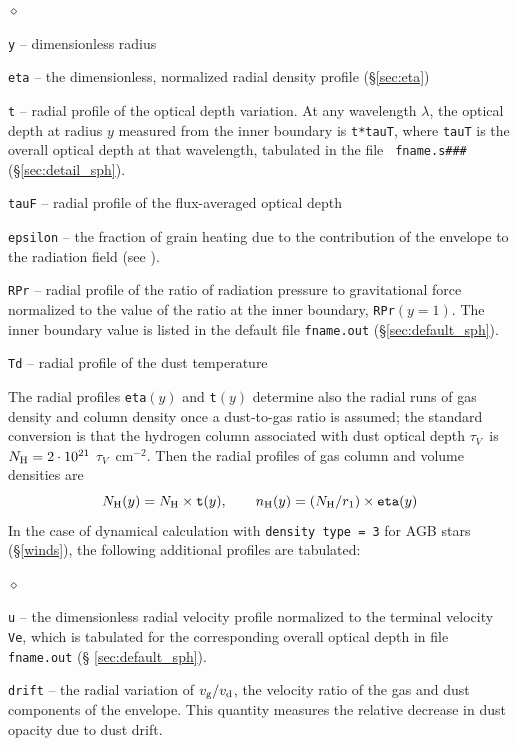 \documentclass[11pt]{article}
\def\E#1{\hbox{$10^{#1}$}}
\def\tV     {\hbox{$\tau_V$}}
\begin{document}
\begin{list}{$\diamond$}{}
\item{\tt y} -- dimensionless radius
\item{\tt eta} -- the dimensionless, normalized radial density profile
  (\S \ref{sec:eta})
\item {\tt t} -- radial profile of the optical depth variation.  At
  any wavelength $\lambda$, the optical depth at radius $y$ measured
  from the inner boundary is {\tt t*tauT}, where {\tt tauT} is the
  overall optical depth at that wavelength, tabulated in the file {\tt
    fname.s\#\#\#} (\S \ref{sec:detail_sph}).

\item{\tt tauF} -- radial profile of the flux-averaged optical depth
\item {\tt epsilon} -- the fraction of grain heating due to the
  contribution of the envelope to the radiation field (see
  \cite{IE97}).
\item{\tt RPr} -- radial profile of the ratio of radiation pressure to
  gravitational force normalized to the value of the ratio at the
  inner boundary, {\tt RPr$(y = 1)$}. The inner boundary value is
  listed in the default file {\tt fname.out} (\S \ref{sec:default_sph}).
\item{\tt Td} -- radial profile of the dust temperature

\end{list}
The radial profiles {\tt eta}$(y)$ and {\tt t}$(y)$ determine also the
radial runs of gas density and column density once a dust-to-gas ratio
is assumed; the standard conversion is that the hydrogen column
associated with dust optical depth \tV\ is $N_{\rm H} = 2\cdot\E{21}$
\tV\ cm$^{-2}$. Then the radial profiles of gas column and volume
densities are
\begin{equation}\label{eq:profiles}
  N_{\rm H}(y) = N_{\rm H}\times{\tt t}(y), \qquad
  n_{\rm H}(y) = (N_{\rm H}/r_1)\times{\tt eta}(y)
\end{equation}
In the case of dynamical calculation with {\tt density type = 3} for
AGB stars (\S\ref{winds}), the following additional profiles are
tabulated:

\begin{list}{$\diamond$}{}
\item {\tt u} -- the dimensionless radial velocity profile normalized
  to the terminal velocity {\tt Ve}, which is tabulated for the
  corresponding overall optical depth in file {\tt fname.out} (\S
  \ref{sec:default_sph}).
\item {\tt drift} -- the radial variation of $v_{\rm g}/v_{\rm d}$,
  the velocity ratio of the gas and dust components of the envelope.
  This quantity measures the relative decrease in dust opacity due to
  dust drift.

\end{list}
\end{document}
